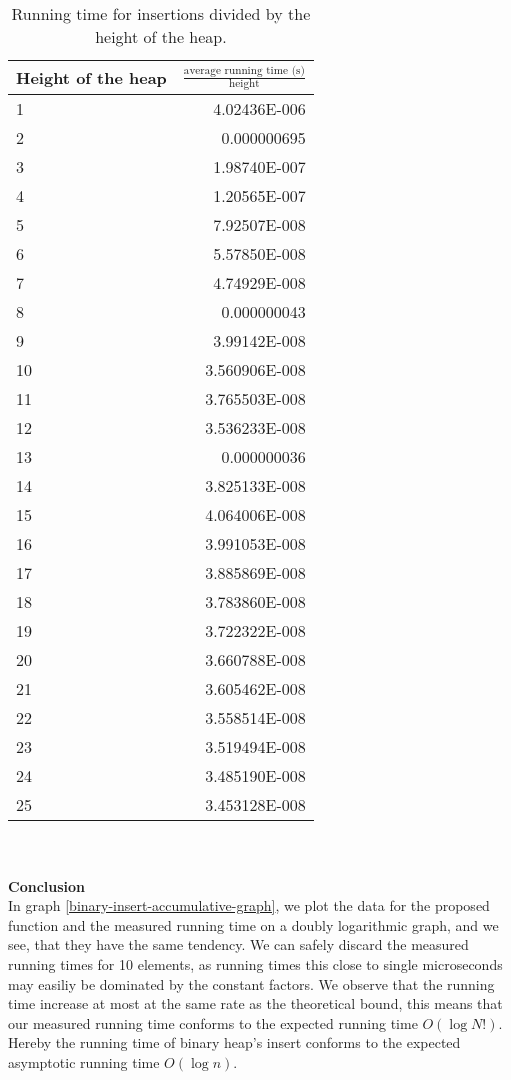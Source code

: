\documentclass[a4paper,10pt]{article}
\begin{document}
\begin{table}
  \begin{center}
    \begin{tabular}{l|r}
      Height of the heap & $\frac{\text{average running time (s)}}{\text{height}}$  \\ %
      \hline
     1 & 4.02436E-006   \\
     2 & 0.000000695    \\
     3 & 1.98740E-007   \\
     4 & 1.20565E-007   \\
     5 & 7.92507E-008   \\
     6 & 5.57850E-008   \\
     7 & 4.74929E-008   \\
     8 & 0.000000043    \\
     9 & 3.99142E-008   \\
     10 & 3.560906E-008 \\
     11 & 3.765503E-008 \\
     12 & 3.536233E-008 \\
     13 & 0.000000036   \\
     14 & 3.825133E-008 \\
     15 & 4.064006E-008 \\
     16 & 3.991053E-008 \\
     17 & 3.885869E-008 \\
     18 & 3.783860E-008 \\
     19 & 3.722322E-008 \\
     20 & 3.660788E-008 \\
     21 & 3.605462E-008 \\
     22 & 3.558514E-008 \\
     23 & 3.519494E-008 \\
     24 & 3.485190E-008 \\
     25 & 3.453128E-008  
    \end{tabular}
    \caption{Running time for insertions divided by the height of the heap. }
    \label{binary-insert-layer}
  \end{center}
\end{table}\\\\
{\bf Conclusion}\\
In graph \ref{binary-insert-accumulative-graph}, we plot the data for the proposed function and the measured running time on a doubly logarithmic graph, and we see, that they have the same tendency. We can safely discard the measured running times for 10 elements, as running times this close to single microseconds may easiliy be dominated by the constant factors. We observe that the running time increase at most at the same rate as the theoretical bound, this means that our measured running time conforms to the expected running time $O(\log N!)$. Hereby the running time of binary heap's insert conforms to the expected asymptotic running time $O(\log n)$.
\end{document}
